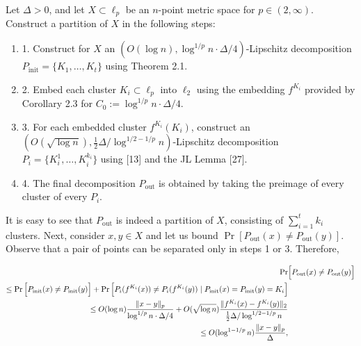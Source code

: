 Let $\Delta>0$, and let $X\subset\ell_{p}$ be an $n$-point metric space for $p\in(2,\infty)$. Construct a partition of $X$ in the following steps:
\par
\begin{enumerate}
\item  1. 
Construct for $X$ an $(O(\log{n}),\log^{1/p}{n}\cdot\Delta/4)$-Lipschitz decomposition $P_{\text{init}}=\{K_{1},\ldots,K_{t}\}$ using Theorem 2.1.
\par
\par
\item  2. 
Embed each cluster $K_{i}\subset\ell_{p}$ into $\ell_{2}$ using the embedding $f^{K_{i}}$ provided by Corollary 2.3 for $C_{0}:=\log^{1/p}{n}\cdot\Delta/4$.
\par
\par
\item  3. 
For each embedded cluster $f^{K_{i}}(K_{i})$, construct an $(O(\sqrt{\log{n}}),\frac{1}{2}\Delta/\log^{1/2-1/p}n)$-Lipschitz decomposition $P_{i}=\{K_{i}^{1},\ldots,K_{i}^{k_{i}}\}$ using [13] and the JL Lemma [27].
\par
\par
\item  4. 
The final decomposition $P_{\text{out}}$ is obtained by taking the preimage of every cluster of every $P_{i}$.
\par
\par
\end{enumerate}
\par
It is easy to see that $P_{\text{out}}$ is indeed a partition of $X$, consisting of $\sum_{i=1}^{t}k_{i}$ clusters. Next, consider $x,y\in X$ and let us bound $\Pr[P_{\text{out}}(x)\neq P_{\text{out}}(y)]$. Observe that a pair of points can be separated only in steps 1 or 3. Therefore,
\par
\[\begin{aligned}
\displaystyle\Pr & \displaystyle\Big{[}P_{\text{out}}(x)\neq P_{\text{out}}(y)\Big{]} \\
\displaystyle\leq\Pr\Big{[}P_{\text{init}}(x)\neq P_{\text{init}}(y)\Big{]}+%
\Pr\Big{[}P_{i}(f^{K_{i}}(x))\neq P_{i}(f^{K_{i}}(y))\mid P_{\text{init}}(x)=P%
_{\text{init}}(y)=K_{i}\Big{]} \\
\displaystyle\leq O(\log{n})\frac{\|x-y\|_{p}}{\log^{1/p}{n}\cdot\Delta/4}+O(%
\sqrt{\log{n}})\frac{\|f^{K_{i}}(x)-f^{K_{i}}(y)\|_{2}}{\frac{1}{2}\Delta/\log%
^{1/2-1/p}n} \\
\displaystyle\leq O(\log^{1-1/p}{n})\frac{\|x-y\|_{p}}{\Delta},
\end{aligned}\]
